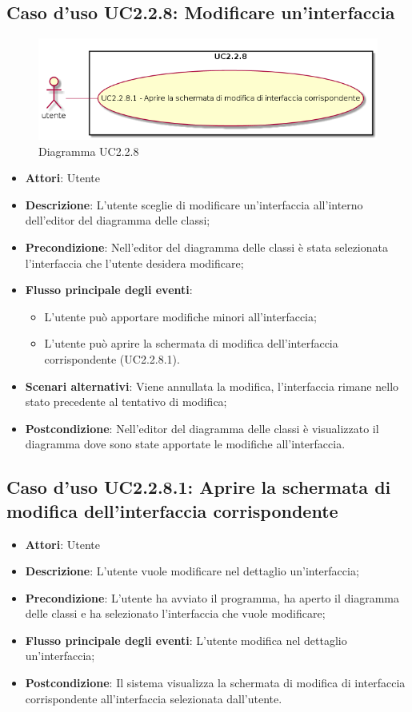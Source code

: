 \documentclass[../AnalisiDeiRequisiti.tex]{subfiles}
\begin{document}
			\subsection{Caso d'uso UC2.2.8: Modificare un'interfaccia}
			\begin{figure} [H]
				\centering
				\includegraphics[scale=0.45]{./Figures/UC2-2-8.png}
				\caption{Diagramma UC2.2.8}\label{}
			\end{figure}
			\begin{itemize}
				\item \textbf{Attori}: Utente
				\item \textbf{Descrizione}: L'utente sceglie di modificare un'interfaccia all'interno dell'editor del diagramma delle classi;
				\item \textbf{Precondizione}: Nell'editor del diagramma delle classi è stata selezionata l'interfaccia che l'utente desidera modificare;
				\item \textbf{Flusso principale degli eventi}: \begin{itemize}
					\item L'utente può apportare modifiche minori all'interfaccia;
					\item L'utente può aprire la schermata di modifica dell'interfaccia corrispondente (UC2.2.8.1).
				\end{itemize}
				\item \textbf{Scenari alternativi}: Viene annullata la modifica, l'interfaccia rimane nello stato precedente al tentativo di modifica;
				\item \textbf{Postcondizione}: Nell'editor del diagramma delle classi è visualizzato il diagramma dove sono state apportate le modifiche all'interfaccia.
			\end{itemize}
			\subsection{Caso d'uso UC2.2.8.1: Aprire la schermata di modifica dell'interfaccia corrispondente}
			\begin{itemize}
				\item \textbf{Attori}: Utente
				\item \textbf{Descrizione}: L'utente vuole modificare nel dettaglio un'interfaccia;
				\item \textbf{Precondizione}: L'utente ha avviato il programma, ha aperto il diagramma delle classi e ha selezionato l'interfaccia che vuole modificare;
				\item \textbf{Flusso principale degli eventi}: L'utente modifica nel dettaglio un'interfaccia;
				\item \textbf{Postcondizione}: Il sistema visualizza la schermata di modifica di interfaccia corrispondente all'interfaccia selezionata dall'utente.
			\end{itemize}
\end{document}
